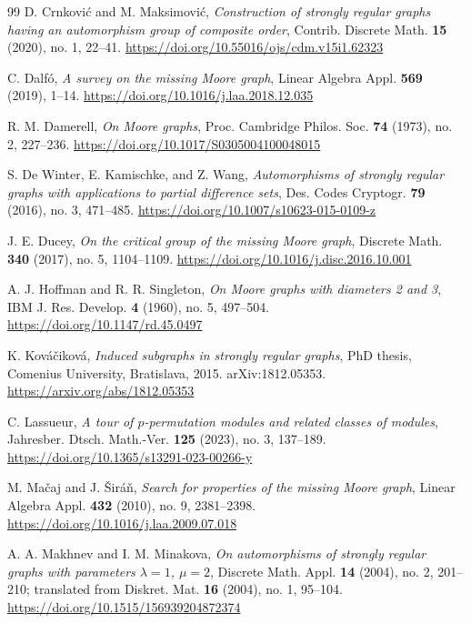 \documentclass[11pt]{article}
\theoremstyle{plain}
\theoremstyle{remark}
\begin{document}
\begin{thebibliography}{99}
D. Crnkovi\'c and M. Maksimovi\'c,
\emph{Construction of strongly regular graphs having an automorphism group of composite order},
Contrib. Discrete Math. \textbf{15} (2020), no. 1, 22--41.
\url{https://doi.org/10.55016/ojs/cdm.v15i1.62323}

C. Dalf\'o,
\emph{A survey on the missing Moore graph},
Linear Algebra Appl. \textbf{569} (2019), 1--14.
\url{https://doi.org/10.1016/j.laa.2018.12.035}

R. M. Damerell,
\emph{On Moore graphs},
Proc. Cambridge Philos. Soc. \textbf{74} (1973), no. 2, 227--236.
\url{https://doi.org/10.1017/S0305004100048015}

S. De Winter, E. Kamischke, and Z. Wang,
\emph{Automorphisms of strongly regular graphs with applications to partial difference sets},
Des. Codes Cryptogr. \textbf{79} (2016), no. 3, 471--485.
\url{https://doi.org/10.1007/s10623-015-0109-z}

J. E. Ducey,
\emph{On the critical group of the missing Moore graph},
Discrete Math. \textbf{340} (2017), no. 5, 1104--1109.
\url{https://doi.org/10.1016/j.disc.2016.10.001}

A. J. Hoffman and R. R. Singleton,
\emph{On Moore graphs with diameters 2 and 3},
IBM J. Res. Develop. \textbf{4} (1960), no. 5, 497--504.
\url{https://doi.org/10.1147/rd.45.0497}

K. Kov\'a\v{c}ikov\'a,
\emph{Induced subgraphs in strongly regular graphs},
PhD thesis, Comenius University, Bratislava, 2015. arXiv:1812.05353.
\url{https://arxiv.org/abs/1812.05353}

C. Lassueur,
\emph{A tour of $p$-permutation modules and related classes of modules},
Jahresber. Dtsch. Math.-Ver. \textbf{125} (2023), no. 3, 137--189.
\url{https://doi.org/10.1365/s13291-023-00266-y}

M. Ma\v{c}aj and J. \v{S}ir\'a\v{n},
\emph{Search for properties of the missing Moore graph},
Linear Algebra Appl. \textbf{432} (2010), no. 9, 2381--2398.
\url{https://doi.org/10.1016/j.laa.2009.07.018}

A. A. Makhnev and I. M. Minakova,
\emph{On automorphisms of strongly regular graphs with parameters $\lambda=1$, $\mu=2$},
Discrete Math. Appl. \textbf{14} (2004), no. 2, 201--210;
translated from Diskret. Mat. \textbf{16} (2004), no. 1, 95--104.
\url{https://doi.org/10.1515/156939204872374}


\end{thebibliography}
\end{document}
